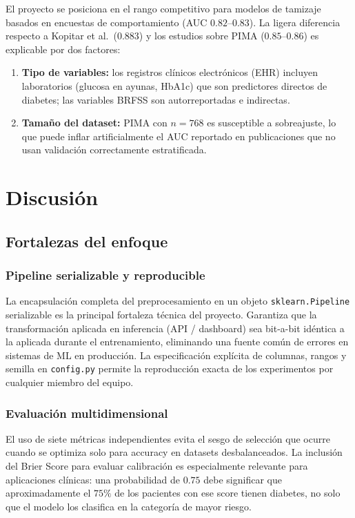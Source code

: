 \documentclass[12pt,a4paper]{article}
\begin{document}
El proyecto se posiciona en el rango competitivo para modelos de tamizaje basados en encuestas de comportamiento (AUC $0.82$--$0.83$). La ligera diferencia respecto a Kopitar et al.\ ($0.883$) y los estudios sobre PIMA ($0.85$--$0.86$) es explicable por dos factores:

\begin{enumerate}[noitemsep]
  \item \textbf{Tipo de variables:} los registros clínicos electrónicos (EHR) incluyen laboratorios (glucosa en ayunas, HbA1c) que son predictores directos de diabetes; las variables BRFSS son autorreportadas e indirectas.
  \item \textbf{Tamaño del dataset:} PIMA con $n=768$ es susceptible a sobreajuste, lo que puede inflar artificialmente el AUC reportado en publicaciones que no usan validación correctamente estratificada.
\end{enumerate}

\section{Discusión}

\subsection{Fortalezas del enfoque}

\subsubsection{Pipeline serializable y reproducible}

La encapsulación completa del preprocesamiento en un objeto \texttt{sklearn.Pipeline} serializable es la principal fortaleza técnica del proyecto. Garantiza que la transformación aplicada en inferencia (API / dashboard) sea bit-a-bit idéntica a la aplicada durante el entrenamiento, eliminando una fuente común de errores en sistemas de ML en producción. La especificación explícita de columnas, rangos y semilla en \texttt{config.py} permite la reproducción exacta de los experimentos por cualquier miembro del equipo.

\subsubsection{Evaluación multidimensional}

El uso de siete métricas independientes evita el sesgo de selección que ocurre cuando se optimiza solo para accuracy en datasets desbalanceados. La inclusión del Brier Score para evaluar calibración es especialmente relevante para aplicaciones clínicas: una probabilidad de $0.75$ debe significar que aproximadamente el $75\%$ de los pacientes con ese score tienen diabetes, no solo que el modelo los clasifica en la categoría de mayor riesgo.
\end{document}

